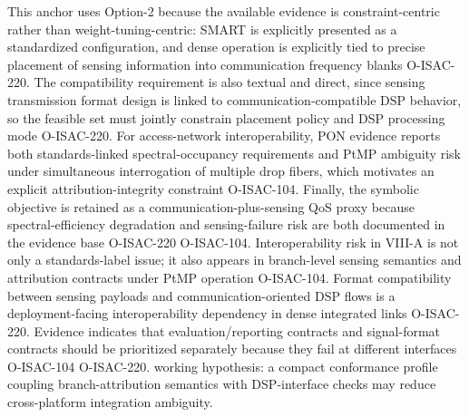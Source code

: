 {}This anchor uses Option-2 because the available evidence is constraint-centric rather than weight-tuning-centric: SMART is explicitly presented as a standardized configuration, and dense operation is explicitly tied to precise placement of sensing information into communication frequency blanks O-ISAC-220. The compatibility requirement is also textual and direct, since sensing transmission format design is linked to communication-compatible DSP behavior, so the feasible set must jointly constrain placement policy and DSP processing mode O-ISAC-220. For access-network interoperability, PON evidence reports both standards-linked spectral-occupancy requirements and PtMP ambiguity risk under simultaneous interrogation of multiple drop fibers, which motivates an explicit attribution-integrity constraint O-ISAC-104. Finally, the symbolic objective  is retained as a communication-plus-sensing QoS proxy because spectral-efficiency degradation and sensing-failure risk are both documented in the evidence base O-ISAC-220 O-ISAC-104.\markdownRendererInterblockSeparator
{}
\markdownRendererSectionEnd \markdownRendererSectionBegin
{}\markdownRendererInterblockSeparator
{}\markdownRendererUlBeginTight
\markdownRendererUlItem Interoperability risk in VIII-A is not only a standards-label issue; it also appears in branch-level sensing semantics and attribution contracts under PtMP operation O-ISAC-104.\markdownRendererUlItemEnd 
\markdownRendererUlItem Format compatibility between sensing payloads and communication-oriented DSP flows is a deployment-facing interoperability dependency in dense integrated links O-ISAC-220.\markdownRendererUlItemEnd 
\markdownRendererUlItem Evidence indicates that evaluation/reporting contracts and signal-format contracts should be prioritized separately because they fail at different interfaces O-ISAC-104 O-ISAC-220.\markdownRendererUlItemEnd 
\markdownRendererUlItem working hypothesis: a compact conformance profile coupling branch-attribution semantics with DSP-interface checks may reduce cross-platform integration ambiguity.\markdownRendererUlItemEnd 
\markdownRendererUlEndTight \markdownRendererInterblockSeparator
{}
\markdownRendererSectionEnd 
\markdownRendererSectionEnd \markdownRendererSectionBegin
{}\markdownRendererInterblockSeparator
{}\markdownRendererSectionBegin
{}\markdownRendererInterblockSeparator
